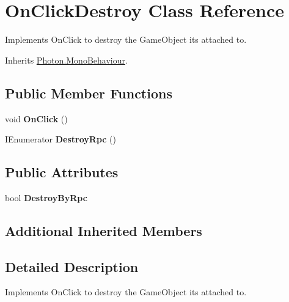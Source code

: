 \hypertarget{class_on_click_destroy}{}\section{On\+Click\+Destroy Class Reference}
\label{class_on_click_destroy}


Implements On\+Click to destroy the Game\+Object it\textquotesingle{}s attached to.  




Inherits \hyperlink{class_photon_1_1_mono_behaviour}{Photon.\+Mono\+Behaviour}.

\subsection*{Public Member Functions}
\begin{DoxyCompactItemize}
\item 
void {\bfseries On\+Click} ()\hypertarget{class_on_click_destroy_ad6050d0a7dac6afab6063ca7b94c317c}{}\label{class_on_click_destroy_ad6050d0a7dac6afab6063ca7b94c317c}

\item 
I\+Enumerator {\bfseries Destroy\+Rpc} ()\hypertarget{class_on_click_destroy_aa4c9d02e0298626789a0c58640ecb827}{}\label{class_on_click_destroy_aa4c9d02e0298626789a0c58640ecb827}

\end{DoxyCompactItemize}
\subsection*{Public Attributes}
\begin{DoxyCompactItemize}
\item 
bool {\bfseries Destroy\+By\+Rpc}\hypertarget{class_on_click_destroy_ac2047f6e4afd9f42f366c09b7ffd7570}{}\label{class_on_click_destroy_ac2047f6e4afd9f42f366c09b7ffd7570}

\end{DoxyCompactItemize}
\subsection*{Additional Inherited Members}


\subsection{Detailed Description}
Implements On\+Click to destroy the Game\+Object it\textquotesingle{}s attached to. 

